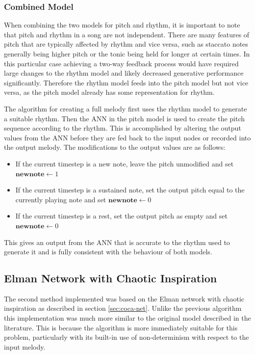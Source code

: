 \documentclass[ author={Stephen Livermore-Tozer},
				supervisor={Dr. Peter Flach},
				degree={MEng},
				title={Algorithmic Co-composition Using Machine Learning},
				subtitle={},
				type={research},
				year={2016} ]{dissertation}
\begin{document}
	\subsubsection{Combined Model}
	
	When combining the two models for pitch and rhythm, it is important to note that pitch and rhythm in a song are not independent. There are many features of pitch that are typically affected by rhythm and vice versa, such as staccato notes generally being higher pitch or the tonic being held for longer at certain times. In this particular case achieving a two-way feedback process would have required large changes to the rhythm model and likely decreased generative performance significantly. Therefore the rhythm model feeds into the pitch model but not vice versa, as the pitch model already has some representation for rhythm.
	
	The algorithm for creating a full melody first uses the rhythm model to generate a suitable rhythm. Then the ANN in the pitch model is used to create the pitch sequence according to the rhythm. This is accomplished by altering the output values from the ANN before they are fed back to the input nodes or recorded into the output melody. The modifications to the output values are as follows:
	\begin{itemize}
		\item If the current timestep is a new note, leave the pitch unmodified and set $\mathbf{new note} \leftarrow 1$
		\item If the current timestep is a sustained note, set the output pitch equal to the currently playing note and set $\mathbf{new note} \leftarrow 0$
		\item If the current timestep is a rest, set the output pitch as empty and set $\mathbf{new note} \leftarrow 0$
	\end{itemize}
	This gives an output from the ANN that is accurate to the rhythm used to generate it and is fully consistent with the behaviour of both models.
	
	\subsection{Elman Network with Chaotic Inspiration}
	\label{sec:elman-implementation}

	The second method implemented was based on the Elman network with chaotic inspiration as described in section \ref{sec:coca-net}. Unlike the previous algorithm this implementation was much more similar to the original model described in the literature. This is because the algorithm is more immediately suitable for this problem, particularly with its built-in use of non-determinism with respect to the input melody. 
	
\end{document}
